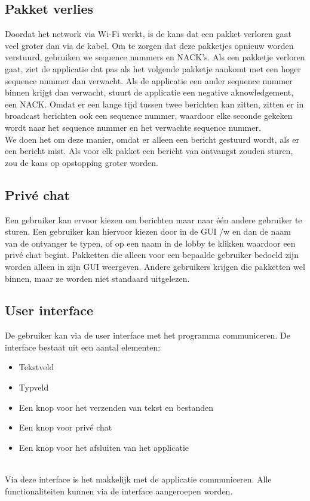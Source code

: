 \documentclass{article}
\begin{document}
\subsection{Pakket verlies}
Doordat het network via Wi-Fi werkt, is de kans dat een pakket verloren gaat veel groter dan via de kabel. Om te zorgen dat deze pakketjes opnieuw worden verstuurd, gebruiken we sequence nummers en NACK's. Als een pakketje verloren gaat, ziet de applicatie dat pas als het volgende pakketje aankomt met een hoger sequence nummer dan verwacht. Als de applicatie een ander sequence nummer binnen krijgt dan verwacht, stuurt de applicatie een negative aknowledgement, een NACK. Omdat er een lange tijd tussen twee berichten kan zitten, zitten er in broadcast berichten ook een sequence nummer, waardoor elke seconde gekeken wordt naar het sequence nummer en het verwachte sequence nummer. \\
We doen het om deze manier, omdat er alleen een bericht gestuurd wordt, als er een bericht mist. Als voor elk pakket een bericht van ontvangst zouden sturen, zou de kans op opstopping groter worden. \\

\subsection{Priv\'{e} chat}
Een gebruiker kan ervoor kiezen om berichten maar naar \'{e}\'{e}n andere gebruiker te sturen. Een gebruiker kan hiervoor kiezen door in de GUI /w en dan de naam van de ontvanger te typen, of op een naam in de lobby te klikken waardoor een priv\'{e} chat begint. Pakketten die alleen voor een bepaalde gebruiker bedoeld zijn worden alleen in zijn GUI weergeven. Andere gebruikers krijgen die pakketten wel binnen, maar ze worden niet standaard uitgelezen. \\

\subsection{User interface}
De gebruiker kan via de user interface met het programma communiceren. De interface bestaat uit een aantal elementen:
\begin{itemize}
\item Tekstveld
\item Typveld
\item Een knop voor het verzenden van tekst en bestanden
\item Een knop voor priv\'{e} chat
\item Een knop voor het afsluiten van het applicatie
\end{itemize}
\\
Via deze interface is het makkelijk met de applicatie communiceren. Alle functionaliteiten kunnen via de interface aangeroepen worden. 
\end{document}
